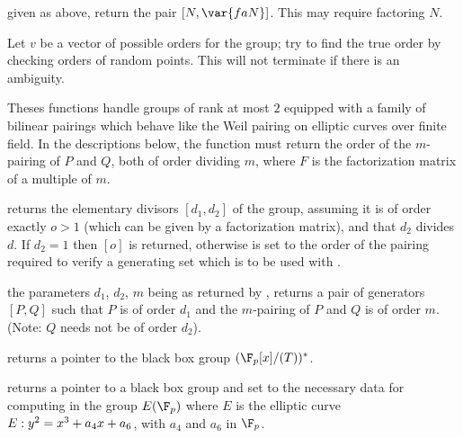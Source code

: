  given  as above,
return the pair $[N, \var{faN}]$. This may require factoring $N$.

Let $v$ be a vector of possible orders for the group; try to find the true
order by checking orders of random points. This will not terminate if there
is an ambiguity.


Theses functions handle groups of rank at most $2$ equipped with a family of
bilinear pairings which behave like the Weil pairing on elliptic curves over
finite field. In the descriptions below, the function  must return the order of the $m$-pairing of $P$ and $Q$, both of order
dividing $m$, where $F$ is the factorization matrix of a multiple of $m$.

returns the elementary divisors $[d_1, d_2]$ of the group, assuming it is of
order exactly $o>1$ (which can be given by a factorization matrix), and that
$d_2$ divides $d$. If $d_2=1$ then $[o]$ is returned, otherwise
 is set to the order of the pairing required to verify a
generating set which is to be used with .

the parameters $d_1$, $d_2$, $m$ being as returned by ,
returns a pair of generators $[P,Q]$ such that $P$ is of order $d_1$ and the
$m$-pairing of $P$ and $Q$ is of order $m$. (Note: $Q$ needs not be of order
$d_2$).



returns a pointer to the black box group $(\F_p[x]/(T))^*$.

returns a pointer to a black box group and set  to the necessary data for
computing in the group $E(\F_p)$ where $E$ is the elliptic curve $E:y^2=x^3+a_4\*x+a_6$,
with $a_4$ and $a_6$ in $\F_p$.

